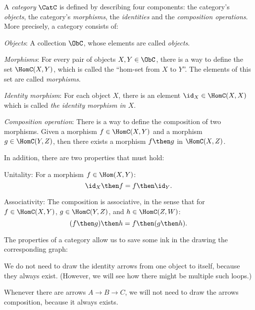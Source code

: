 \begin{shaded}
\begin{definition}[Category] \label{def:categorymain}
A \emph{category} $\CatC$ is defined by describing four components: the
category's \emph{objects}, the category's \emph{morphisms},
the \emph{identities} and the \emph{composition operations}. More precisely,
a category consists of:
\begin{compactenum}
\item \emph{Objects}: A collection $\ObC$, whose elements are called \emph{objects}.
\item \emph{Morphisms}: For every pair of objects $X, Y\in\ObC$, there is
a way to define the set $\HomC(X, Y)$, which is called the ``hom-set from
$X$ to $Y$''. The elements of this set are called \emph{morphisms}.
\item \emph{Identity morphism}:  For each object $X$, there is
an element $\id_X \in \HomC(X,X) $ which is called \emph{the identity
morphism in $X$}.
\item \emph{Composition operation}: There is a way to define the composition
of two morphisms. Given a morphism $f \in  \HomC(X,Y) $ and a morphism $g \in \HomC(Y, Z)$, then
there exists a morphism $f\then g$ in $\HomC(X, Z)$.

In addition, there are two properties that must hold:

\begin{compactenum}
    \item Unitality: For a morphism $f\in\Hom(X,Y)$: 
    \begin{equation}
        \id_X \then f=f \then \id_Y.
    \end{equation}
    \item Associativity: The composition is associative, in the sense that for $f\in \HomC(X,Y)$, $g\in \HomC(Y,Z)$, and $h\in \HomC(Z,W)$:
    \begin{equation}
        (f\then g)\then h= f \then (g \then h).
    \end{equation}
\end{compactenum}

\end{compactenum}
\end{definition}
\end{shaded}


The properties of a category allow us to save some ink in the drawing the
corresponding graph:
\begin{compactitem}
\item We do not need to draw the identity arrows from one object to itself, because they always exist. (However, we will see how there might be multiple such loops.)
\item  Whenever there are arrows $A\to B \to C$, we will not need to draw the arrows composition, because it always exists.
\end{compactitem}

